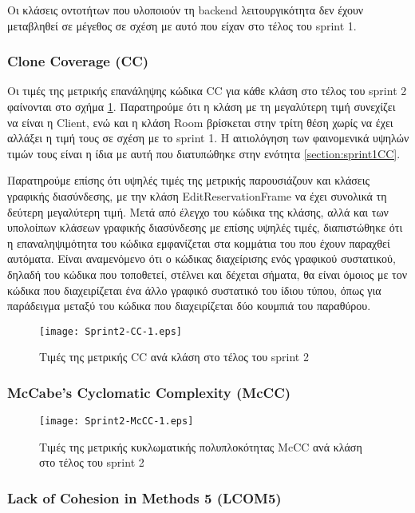 Οι κλάσεις οντοτήτων που υλοποιούν τη backend λειτουργικότητα δεν έχουν
μεταβληθεί σε μέγεθος σε σχέση με αυτό που είχαν στο τέλος του sprint 1.

\subsubsection{Clone Coverage (CC)}
\label{section:sprint2CC}

Οι τιμές της μετρικής επανάληψης κώδικα CC για κάθε κλάση στο τέλος του
sprint 2 φαίνονται στο σχήμα \ref{fig:sprint2CC}. Παρατηρούμε ότι η
κλάση με τη μεγαλύτερη τιμή συνεχίζει να είναι η Client, ενώ και η κλάση
Room βρίσκεται στην τρίτη θέση χωρίς να έχει
αλλάξει η τιμή τους σε σχέση με το sprint 1. Η αιτιολόγηση των
φαινομενικά υψηλών τιμών τους είναι η ίδια με αυτή που διατυπώθηκε στην
ενότητα \ref{section:sprint1CC}.

Παρατηρούμε επίσης ότι υψηλές τιμές της μετρικής παρουσιάζουν και
κλάσεις γραφικής διασύνδεσης, με την κλάση EditReservationFrame να έχει
συνολικά τη δεύτερη μεγαλύτερη τιμή. Μετά από έλεγχο του κώδικα της
κλάσης, αλλά και των υπολοίπων κλάσεων γραφικής διασύνδεσης με επίσης
υψηλές τιμές, διαπιστώθηκε ότι η επαναληψιμότητα του κώδικα εμφανίζεται
στα κομμάτια του που έχουν παραχθεί αυτόματα. Είναι αναμενόμενο ότι ο
κώδικας διαχείρισης ενός γραφικού συστατικού, δηλαδή του κώδικα που
τοποθετεί, στέλνει και δέχεται σήματα, θα είναι όμοιος με τον
κώδικα που διαχειρίζεται ένα άλλο γραφικό συστατικό του ίδιου τύπου,
όπως για παράδειγμα μεταξύ του κώδικα που διαχειρίζεται δύο κουμπιά του
παραθύρου.

\begin{figure}
\centering
\texttt{[image: Sprint2-CC-1.eps]}
\caption{Τιμές της μετρικής CC ανά κλάση στο τέλος του sprint 2}
\label{fig:sprint2CC}
\end{figure}

\subsubsection{McCabe’s Cyclomatic Complexity (McCC)}
\label{section:sprint2McCC}

\begin{figure}
\centering
\texttt{[image: Sprint2-McCC-1.eps]}
\caption{Τιμές της μετρικής κυκλωματικής πολυπλοκότητας McCC ανά κλάση στο τέλος του sprint 2}
\label{fig:sprint2McCC}
\end{figure}

\subsubsection{Lack of Cohesion in Methods 5 (LCOM5)}
\label{section:sprint2LCOM5}

